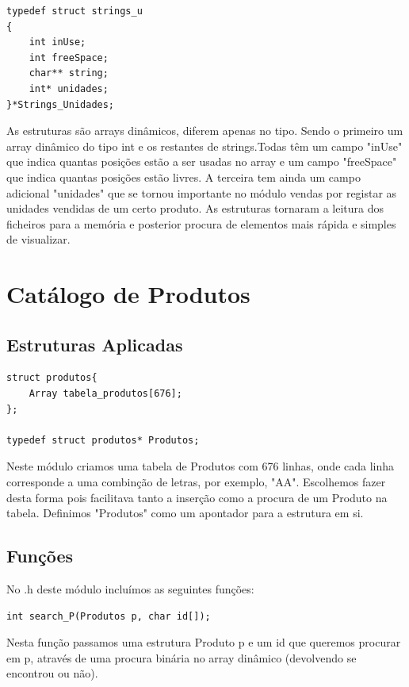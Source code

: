 \documentclass[a4paper]{report} %
\begin{document}
\begin{lstlisting}[style=CStyle]
typedef struct strings_u
{
	int inUse;			
	int freeSpace;		
	char** string;		
	int* unidades;
}*Strings_Unidades;
\end{lstlisting}

\par As estruturas são arrays dinâmicos, diferem apenas no tipo. Sendo o primeiro um array dinâmico do tipo int e os restantes de strings.Todas têm um campo "inUse" que indica quantas posições estão a ser usadas no array e um campo "freeSpace" que indica quantas posições estão livres. A terceira tem ainda um campo adicional "unidades" que se tornou importante no módulo vendas por registar as unidades vendidas de um certo produto. As estruturas tornaram a leitura dos ficheiros para a memória e posterior procura de elementos mais rápida e simples de visualizar.

\newpage

\section{Catálogo de Produtos}

\subsection{Estruturas Aplicadas}

\begin{lstlisting}[style=CStyle]
struct produtos{
	Array tabela_produtos[676];
};

typedef struct produtos* Produtos;

\end{lstlisting}

\par Neste módulo criamos uma tabela de Produtos com 676 linhas, onde cada linha corresponde a uma combinção de letras, por exemplo, "AA". Escolhemos fazer desta forma pois facilitava tanto a inserção como a procura de um Produto na tabela. Definimos "Produtos" como um apontador para a estrutura em si.
\par

\subsection{Funções}

No .h deste módulo incluímos as seguintes funções:

\begin{lstlisting}[style=CStyle]
int search_P(Produtos p, char id[]);
\end{lstlisting}
Nesta função passamos uma estrutura Produto p e um id que queremos procurar em p, através de uma procura binária no array dinâmico (devolvendo se encontrou ou não).
\end{document}

